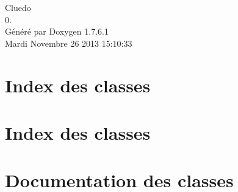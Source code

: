 \documentclass[a4paper]{book}
\begin{document}
\hypersetup{pageanchor=false,citecolor=blue}
\begin{titlepage}
\vspace*{7cm}
\begin{center}
{\Large \-Cluedo \\[1ex]\large 0. }\\
\vspace*{1cm}
{\large \-Généré par Doxygen 1.7.6.1}\\
\vspace*{0.5cm}
{\small Mardi Novembre 26 2013 15:10:33}\\
\end{center}
\end{titlepage}
\clearemptydoublepage
{}
\tableofcontents
\clearemptydoublepage
{}
\hypersetup{pageanchor=true,citecolor=blue}
\chapter{\-Index des classes}

\chapter{\-Index des classes}

\chapter{\-Documentation des classes}





































\printindex
\end{document}
